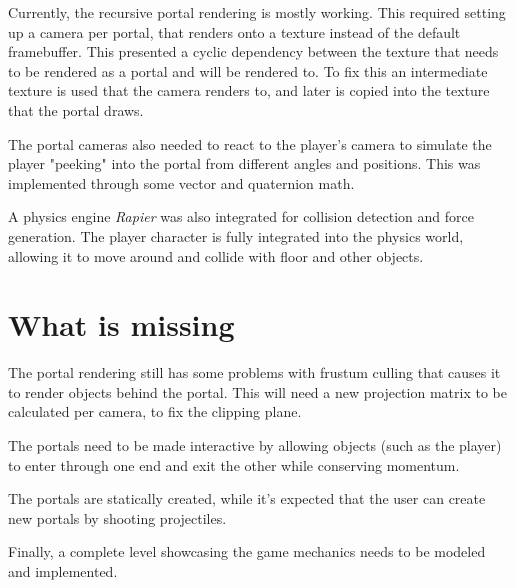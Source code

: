 \documentclass{article}
\begin{document}
Currently, the recursive portal rendering is mostly working. This required
setting up a camera per portal, that renders onto a texture instead of the
default framebuffer. This presented a cyclic dependency between the texture
that needs to be rendered as a portal and will be rendered to. To fix this an
intermediate texture is used that the camera renders to, and later is copied
into the texture that the portal draws.

The portal cameras also needed to react to the player's camera to simulate the
player "peeking" into the portal from different angles and positions. This was
implemented through some vector and quaternion math.

A physics engine \emph{Rapier} was also integrated for collision detection and
force generation. The player character is fully integrated into the physics
world, allowing it to move around and collide with floor and other objects.

\section*{What is missing}

The portal rendering still has some problems with frustum culling that causes
it to render objects behind the portal. This will need a new projection matrix
to be calculated per camera, to fix the clipping plane.

The portals need to be made interactive by allowing objects (such as the
player) to enter through one end and exit the other while conserving momentum.

The portals are statically created, while it's expected that the user can
create new portals by shooting projectiles.

Finally, a complete level showcasing the game mechanics needs to be
modeled and implemented.
\end{document}
